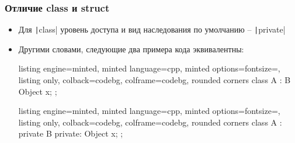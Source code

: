 \documentclass[10pt]{beamer}
\begin{document}
\begin{frame}[fragile]
\frametitle{Отличие class и struct}
\begin{itemize}
\item Для \texttt|class| уровень доступа и вид наследования по умолчанию -- \texttt|private|
\pause
\item Другими словами, следующие два примера кода эквивалентны:
\begin{tcblisting}{listing engine=minted, minted language=cpp, minted options={fontsize=\scriptsize}, listing only, colback=codebg, colframe=codebg, rounded corners}
class A : B {
  Object x;
};
\end{tcblisting}
\begin{tcblisting}{listing engine=minted, minted language=cpp, minted options={fontsize=\scriptsize}, listing only, colback=codebg, colframe=codebg, rounded corners}
class A : private B {
private:
  Object x;
};
\end{tcblisting}
\end{itemize}
\end{frame}
\end{document}
